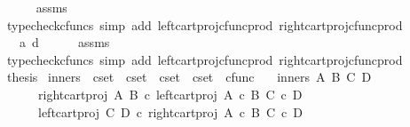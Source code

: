 \begin{isabellebody}
\ \ \ \ \isamarkupfalse%
\ assms\ \isamarkupfalse%
\ {\isacharparenleft}{\kern0pt}typecheck{\isacharunderscore}{\kern0pt}cfuncs{\isacharcomma}{\kern0pt}\ simp\ add{\isacharcolon}{\kern0pt}\ left{\isacharunderscore}{\kern0pt}cart{\isacharunderscore}{\kern0pt}proj{\isacharunderscore}{\kern0pt}cfunc{\isacharunderscore}{\kern0pt}prod\ right{\isacharunderscore}{\kern0pt}cart{\isacharunderscore}{\kern0pt}proj{\isacharunderscore}{\kern0pt}cfunc{\isacharunderscore}{\kern0pt}prod{\isacharparenright}{\kern0pt}\isanewline
\ \ \isamarkupfalse%
\ \isamarkupfalse%
\ {\isachardoublequoteopen}{\isachardot}{\kern0pt}{\isachardot}{\kern0pt}{\isachardot}{\kern0pt}\ {\isacharequal}{\kern0pt}\ {\isasymlangle}a{\isacharcomma}{\kern0pt}\ d{\isasymrangle}{\isachardoublequoteclose}\isanewline
\ \ \ \ \isamarkupfalse%
\ assms\ \isamarkupfalse%
\ {\isacharparenleft}{\kern0pt}typecheck{\isacharunderscore}{\kern0pt}cfuncs{\isacharcomma}{\kern0pt}\ simp\ add{\isacharcolon}{\kern0pt}\ left{\isacharunderscore}{\kern0pt}cart{\isacharunderscore}{\kern0pt}proj{\isacharunderscore}{\kern0pt}cfunc{\isacharunderscore}{\kern0pt}prod\ right{\isacharunderscore}{\kern0pt}cart{\isacharunderscore}{\kern0pt}proj{\isacharunderscore}{\kern0pt}cfunc{\isacharunderscore}{\kern0pt}prod{\isacharparenright}{\kern0pt}\isanewline
\ \ \isamarkupfalse%
\ \isamarkupfalse%
\ {\isacharquery}{\kern0pt}thesis\isacommand{{\isachardot}{\kern0pt}}\isamarkupfalse%
\isanewline
{}\isamarkupfalse%
%
\endisatagproof
{\isafoldproof}%
%
\isadelimproof
\isanewline
%
\endisadelimproof
\isanewline
{}\isamarkupfalse%
\ inners\ {\isacharcolon}{\kern0pt}{\isacharcolon}{\kern0pt}\ {\isachardoublequoteopen}cset\ {\isasymRightarrow}\ cset\ {\isasymRightarrow}\ cset\ {\isasymRightarrow}\ cset\ {\isasymRightarrow}\ cfunc{\isachardoublequoteclose}\ \isanewline
\ \ {\isachardoublequoteopen}inners\ A\ B\ C\ D\ {\isacharequal}{\kern0pt}\ {\isasymlangle}\isanewline
\ \ \ \ \ \ right{\isacharunderscore}{\kern0pt}cart{\isacharunderscore}{\kern0pt}proj\ A\ B\ {\isasymcirc}\isactrlsub c\ left{\isacharunderscore}{\kern0pt}cart{\isacharunderscore}{\kern0pt}proj\ {\isacharparenleft}{\kern0pt}A\ {\isasymtimes}\isactrlsub c\ B{\isacharparenright}{\kern0pt}\ {\isacharparenleft}{\kern0pt}C\ {\isasymtimes}\isactrlsub c\ D{\isacharparenright}{\kern0pt}{\isacharcomma}{\kern0pt}\isanewline
\ \ \ \ \ \ left{\isacharunderscore}{\kern0pt}cart{\isacharunderscore}{\kern0pt}proj\ C\ D\ {\isasymcirc}\isactrlsub c\ right{\isacharunderscore}{\kern0pt}cart{\isacharunderscore}{\kern0pt}proj\ {\isacharparenleft}{\kern0pt}A\ {\isasymtimes}\isactrlsub c\ B{\isacharparenright}{\kern0pt}\ {\isacharparenleft}{\kern0pt}C\ {\isasymtimes}\isactrlsub c\ D{\isacharparenright}{\kern0pt}\isanewline

\end{isabellebody}
